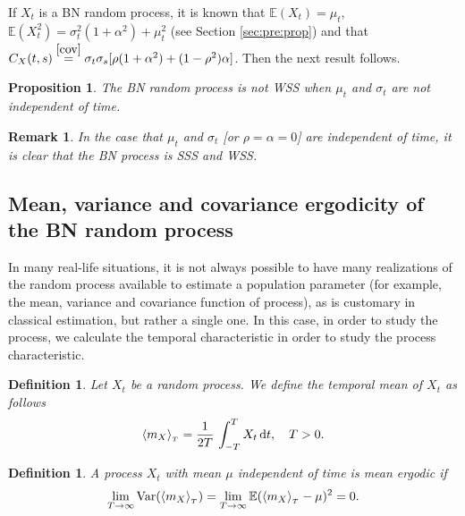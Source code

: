 \documentclass[12pt]{article}
\newtheorem{proposition}[theorem]{Proposition}
\newtheorem{definition}[theorem]{Definition}
\newtheorem{remark}[theorem]{Remark}
\theoremstyle{definition}
\begin{document}
If $X_t$ is a BN random process,  it is known that $\mathbb{E}(X_t)=\mu_t$, $\mathbb{E}(X_t^2)=\sigma_t^2(1+\alpha^2)+\mu_t^2$ (see Section \ref{sec:pre:prop}) and that $C_X(t,s)\stackrel{\eqref{cov}}{=}\sigma_t\sigma_s[
\rho(1+\alpha^2)+(1-\rho^2)\alpha]$. Then the next result follows.

\begin{proposition}\label{not-WSS}
	The BN random process is not WSS when $\mu_t$ and $\sigma_t$ are not independent of time.
\end{proposition}

\begin{remark}
	In the case that $\mu_t$ and $\sigma_t$ [or $\rho=\alpha=0$] are independent of time, it is clear that the BN process is SSS and WSS.
\end{remark}





\subsection{Mean, variance and covariance ergodicity of the BN random process}
In many real-life situations, it is not always possible to have many realizations of the random process available to estimate a population parameter (for example, the mean, variance and covariance function of process), as is customary in classical estimation, but rather a single one. In this case,  in order to study the process, we calculate the temporal characteristic in order to study the process characteristic.

\begin{definition}
Let $X_t$ be a random process. We define the temporal mean of $X_t$ as follows
\begin{align*}
\langle m_X\rangle_{_T}={1\over 2T}\, \int_{-T}^{T} X_t\, {\rm d} t, \quad T>0.
\end{align*}
\end{definition}

\begin{definition}
A process $X_t$  with mean $\mu$ independent of time is mean ergodic if
\begin{align*}
\lim_{T\to\infty} {\rm Var}(\langle m_X\rangle_{_T})
= 
\lim_{T\to\infty} 
\mathbb{E}(\langle m_X\rangle_{_T}-\mu)^2
=0.
\end{align*}
\end{definition}
\end{document}
